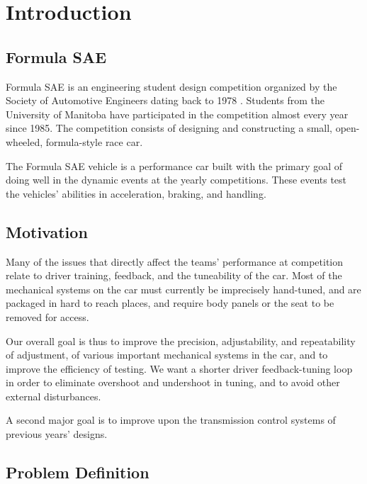 %
%
%
%

\chapter{Introduction}

\section{Formula SAE}

Formula SAE is an engineering student design competition organized by the Society of Automotive Engineers dating back to 1978 \cite{fsaehistory}. Students from the University of Manitoba have participated in the competition almost every year since 1985. The competition consists of designing and constructing a small, open-wheeled, formula-style race car.

The Formula SAE vehicle is a performance car built with the primary goal of doing well in the dynamic events at the yearly competitions. These events test the vehicles' abilities in acceleration, braking, and handling. 

\section{Motivation}

Many of the issues that directly affect the teams' performance at competition relate to driver training, feedback, and the tuneability of the car. Most of the mechanical systems on the car must currently be imprecisely hand-tuned, and are packaged in hard to reach places, and require body panels or the seat to be removed for access.

Our overall goal is thus to improve the precision, adjustability, and repeatability of adjustment, of various important mechanical systems in the car, and to improve the efficiency of testing. We want a shorter driver feedback-tuning loop in order to eliminate overshoot and undershoot in tuning, and to avoid other external disturbances.

A second major goal is to improve upon the transmission control systems of previous years' designs.

\section{Problem Definition}

